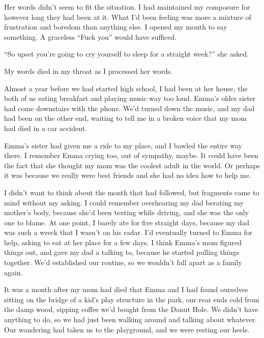 Her words didn't seem to fit the situation.  I had maintained my composure for however long they had been at it.  What I'd been feeling was more a mixture of frustration and boredom than anything else.  I opened my mouth to say something.  A graceless ``Fuck you'' would have sufficed.



``So upset you're going to cry yourself to sleep for a straight week?'' she asked.



My words died in my throat as I processed her words.



Almost a year before we had started high school, I had been at her house, the both of us eating breakfast and playing music way too loud.  Emma's older sister had come downstairs with the phone.  We'd turned down the music, and my dad had been on the other end, waiting to tell me in a broken voice that my mom had died in a car accident.



Emma's sister had given me a ride to my place, and I bawled the entire way there.  I remember Emma crying too, out of sympathy, maybe.  It could have been the fact that she thought my mom was the coolest adult in the world.  Or perhaps it was because we really were best friends and she had no idea how to help me.



I didn't want to think about the month that had followed, but fragments came to mind without my asking.  I could remember overhearing my dad berating my mother's body, because she'd been texting while driving, and she was the only one to blame.  At one point, I barely ate for five straight days, because my dad was such a wreck that I wasn't on his radar. I'd eventually turned to Emma for help, asking to eat at her place for a few days.  I think Emma's mom figured things out, and gave my dad a talking to, because he started pulling things together.  We'd established our routine, so we wouldn't fall apart as a family again.



It was a month after my mom had died that Emma and I had found ourselves sitting on the bridge of a kid's play structure in the park, our rear ends cold from the damp wood, sipping coffee we'd bought from the Donut Hole.  We didn't have anything to do, so we had just been walking around and talking about whatever.  Our wandering had taken us to the playground, and we were resting our heels.



